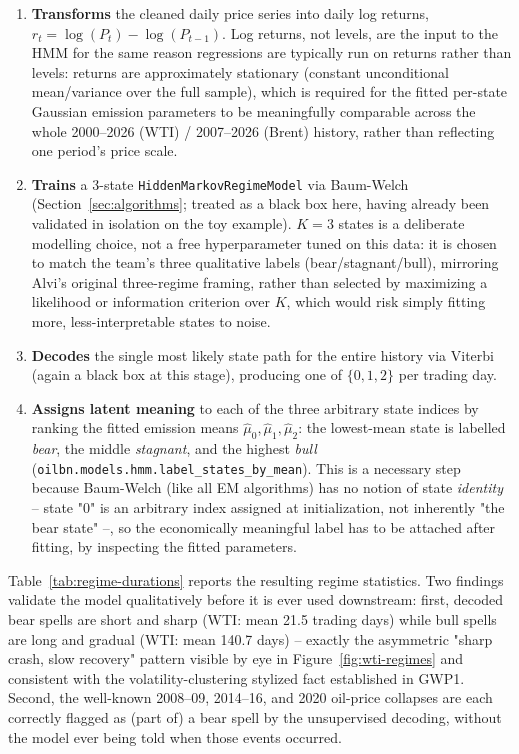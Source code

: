 \begin{enumerate}
  \item \textbf{Transforms} the cleaned daily price series into daily
    log returns, $r_t = \log(P_t) - \log(P_{t-1})$. Log returns, not
    levels, are the input to the HMM for the same reason regressions are
    typically run on returns rather than levels: returns are
    approximately stationary (constant unconditional mean/variance over
    the full sample), which is required for the fitted per-state
    Gaussian emission parameters to be meaningfully comparable across
    the whole 2000--2026 (WTI) / 2007--2026 (Brent) history, rather than
    reflecting one period's price scale.
  \item \textbf{Trains} a 3-state \texttt{HiddenMarkovRegimeModel} via
    Baum-Welch (Section~\ref{sec:algorithms}; treated as a black box
    here, having already been validated in isolation on the toy
    example). $K=3$ states is a deliberate modelling choice, not a
    free hyperparameter tuned on this data: it is chosen to match the
    team's three qualitative labels (bear/stagnant/bull), mirroring
    Alvi's original three-regime framing, rather than selected by
    maximizing a likelihood or information criterion over $K$, which
    would risk simply fitting more, less-interpretable states to noise.
  \item \textbf{Decodes} the single most likely state path for the
    entire history via Viterbi (again a black box at this stage),
    producing one of $\{0, 1, 2\}$ per trading day.
  \item \textbf{Assigns latent meaning} to each of the three arbitrary
    state indices by ranking the fitted emission means
    $\hat\mu_0,\hat\mu_1,\hat\mu_2$: the lowest-mean state is labelled
    \emph{bear}, the middle \emph{stagnant}, and the highest \emph{bull}
    (\texttt{oilbn.models.hmm.\allowbreak label\_states\_by\_mean}). This is a
    necessary step because Baum-Welch (like all EM algorithms) has no
    notion of state \emph{identity} -- state "0" is an arbitrary index
    assigned at initialization, not inherently "the bear state" --, so
    the economically meaningful label has to be attached after fitting,
    by inspecting the fitted parameters.
\end{enumerate}

Table~\ref{tab:regime-durations} reports the resulting regime
statistics. Two findings validate the model qualitatively before it is
ever used downstream: first, decoded bear spells are short and sharp
(WTI: mean 21.5 trading days) while bull spells are long and gradual
(WTI: mean 140.7 days) -- exactly the asymmetric "sharp crash, slow
recovery" pattern visible by eye in Figure~\ref{fig:wti-regimes} and
consistent with the volatility-clustering stylized fact established in
GWP1. Second, the well-known 2008--09, 2014--16, and 2020 oil-price
collapses are each correctly flagged as (part of) a bear spell by the
unsupervised decoding, without the model ever being told when those
events occurred.

